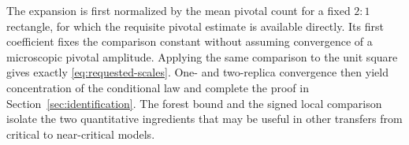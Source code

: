 The expansion is first normalized by the mean pivotal count for a
fixed $2:1$ rectangle, for which the requisite pivotal estimate is
available directly. Its first coefficient fixes the comparison constant
without assuming convergence of a microscopic pivotal amplitude.
Applying the same comparison to the unit square gives exactly
\eqref{eq:requested-scales}. One- and two-replica convergence then
yield concentration of the conditional law and complete the proof in
Section~\ref{sec:identification}. The forest bound and the signed
local comparison isolate the two quantitative ingredients that may
be useful in other transfers from critical to near-critical models.

